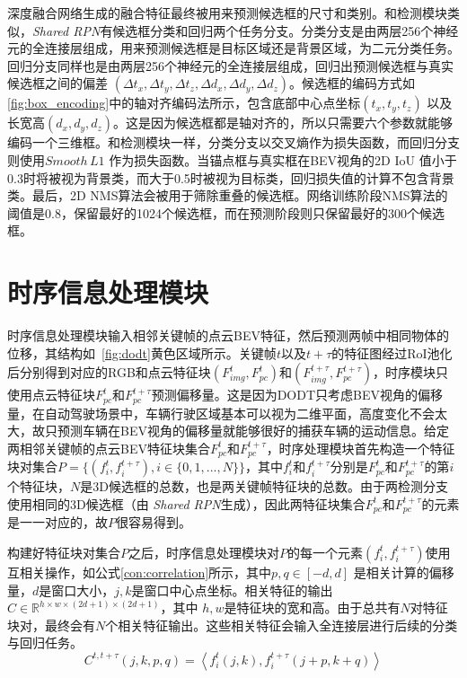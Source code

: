 深度融合网络生成的融合特征最终被用来预测候选框的尺寸和类别。和检测模块类似，\textit{Shared RPN}有候选框分类和回归两个任务分支。分类分支是由两层256个神经元的全连接层组成，用来预测候选框是目标区域还是背景区域，为二元分类任务。回归分支同样也是由两层256个神经元的全连接层组成，回归出预测候选框与真实候选框之间的偏差 $(\Delta t_x,  \Delta t_y, \Delta t_z, \Delta d_x, \Delta d_y, \Delta d_z)$。候选框的编码方式如\figurename \ref{fig:box_encoding}中的轴对齐编码法所示，包含底部中心点坐标$(t_x, t_y, t_z)$ 以及长宽高$(d_x, d_y, d_z)$。这是因为候选框都是轴对齐的，所以只需要六个参数就能够编码一个三维框。和检测模块一样，分类分支以交叉熵作为损失函数，而回归分支则使用$Smooth \, L1$ 作为损失函数。当锚点框与真实框在BEV视角的2D IoU 值小于0.3时将被视为背景类，而大于0.5时被视为目标类，回归损失值的计算不包含背景类。最后，2D NMS算法会被用于筛除重叠的候选框。网络训练阶段NMS算法的阈值是0.8，保留最好的1024个候选框，而在预测阶段则只保留最好的300个候选框。

\section{时序信息处理模块}
\label{temporal_module}

时序信息处理模块输入相邻关键帧的点云BEV特征，然后预测两帧中相同物体的位移，其结构如\figurename \, \ref{fig:dodt}黄色区域所示。关键帧$t$以及$t+\tau$的特征图经过RoI池化后分别得到对应的RGB和点云特征块$(F^t_{img}, F^t_{pc})$和$(F^{t+\tau}_{img}, F^{t+\tau}_{pc})$，时序模块只使用点云特征块$F^t_{pc}$和$F^{t+\tau}_{pc}$预测偏移量。这是因为DODT只考虑BEV视角的偏移量，在自动驾驶场景中，车辆行驶区域基本可以视为二维平面，高度变化不会太大，故只预测车辆在BEV视角的偏移量就能够很好的捕获车辆的运动信息。给定两相邻关键帧的点云BEV特征块集合$F^t_{pc}$和$F^{t+\tau}_{pc}$，时序处理模块首先构造一个特征块对集合$P = \{(f^t_i, f^{t+\tau}_i), i \in \{0, 1, ..., N\}\}$，其中$f^t_i$和$f^{t+\tau}_i$分别是$F^t_{pc}$和$F^{t+\tau}_{pc}$的第$i$个特征块，$N$是3D候选框的总数，也是两关键帧特征块的总数。由于两检测分支使用相同的3D候选框（由 \textit{Shared RPN}生成），因此两特征块集合$F^t_{pc}$和$F^{t+\tau}_{pc}$的元素是一一对应的，故$P$很容易得到。

构建好特征块对集合$P$之后，时序信息处理模块对$P$的每一个元素$(f^t_i, f^{t+\tau}_i)$使用互相关操作，如公式\ref{con:correlation}所示，其中$p,q \in [-d, d]$ 是相关计算的偏移量，$d$是窗口大小，$j,k$是窗口中心点坐标。相关特征的输出$C \in \mathbb{R}^{h \times w \times (2d+1) \times (2d+1)}$，其中 $h,w$是特征块的宽和高。由于总共有$N$对特征块对，最终会有$N$个相关特征输出。这些相关特征会输入全连接层进行后续的分类与回归任务。
\begin{equation}
C^{t,t+\tau}(j,k,p,q) = \left \langle f^t_i(j,k), f^{t+\tau}_i(j+p,k+q) \right \rangle
\label{con:correlation}
\end{equation}

